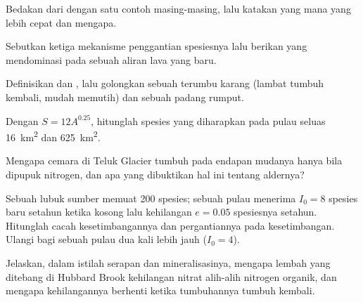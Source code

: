 \begin{exercise}[$\star$]\label{exo:b1:ecosystem-dynamics:1}
Bedakan  dari  dengan satu contoh
masing-masing, lalu katakan yang mana yang lebih cepat dan mengapa.
\end{exercise}

\begin{exercise}[$\star$]\label{exo:b1:ecosystem-dynamics:2}
Sebutkan ketiga mekanisme penggantian spesiesnya lalu berikan yang
mendominasi pada sebuah aliran lava yang baru.
\end{exercise}

\begin{exercise}[$\star$]\label{exo:b1:ecosystem-dynamics:3}
Definisikan  dan , lalu golongkan sebuah terumbu
karang (lambat tumbuh kembali, mudah memutih) dan sebuah padang
rumput.
\end{exercise}

\begin{exercise}[$\star$]\label{exo:b1:ecosystem-dynamics:4}
Dengan $S = 12 A^{0.25}$, hitunglah spesies yang diharapkan pada pulau
seluas \qty{16}{km^2} dan \qty{625}{km^2}.
\end{exercise}

\begin{exercise}[$\star\star$]\label{exo:b1:ecosystem-dynamics:5}
Mengapa cemara di Teluk Glacier tumbuh pada endapan mudanya hanya bila
dipupuk nitrogen, dan apa yang dibuktikan hal ini tentang aldernya?
\end{exercise}

\begin{exercise}[$\star\star$]\label{exo:b1:ecosystem-dynamics:6}
Sebuah lubuk sumber memuat 200 spesies; sebuah pulau menerima $I_0 = 8$
spesies baru setahun ketika kosong lalu kehilangan $e = 0.05$
spesiesnya setahun. Hitunglah cacah kesetimbangannya dan pergantiannya
pada kesetimbangan. Ulangi bagi sebuah pulau dua kali lebih jauh
($I_0 = 4$).
\end{exercise}

\begin{exercise}[$\star\star$]\label{exo:b1:ecosystem-dynamics:7}
Jelaskan, dalam istilah serapan dan mineralisasinya, mengapa lembah
yang ditebang di Hubbard Brook kehilangan nitrat alih-alih nitrogen
organik, dan mengapa kehilangannya berhenti ketika tumbuhannya tumbuh
kembali.
\end{exercise}

